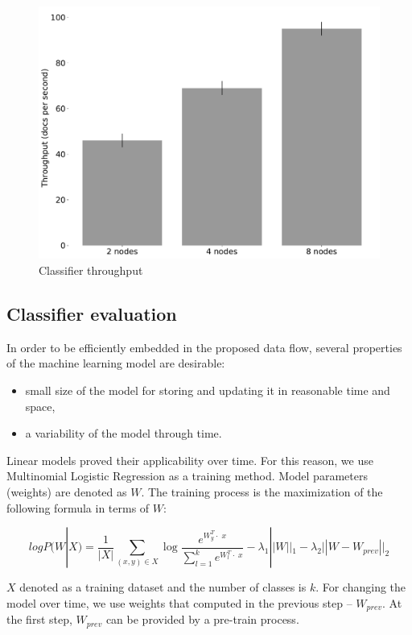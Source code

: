 \begin{figure}[htbp]
  \centering
  \includegraphics[scale=0.25]{pics/classifier_throughput}
  \caption{Classifier throughput}
  \label {throughput}
\end{figure}

\subsection{Classifier evaluation}

In order to be efficiently embedded in the proposed data flow, several properties of the machine learning model are desirable:
\begin{itemize}
     \item small size of the model for storing and updating it in reasonable time and space,
     \item a variability of the model through time.
\end{itemize}

Linear models proved their applicability over time. For this reason, we use Multinomial Logistic Regression as a training method. Model parameters (weights) are denoted as $W$. The training process is the maximization of the following formula in terms of $W$:

$$ logP(W | X) = \frac{1}{|X|} \sum \limits_{(x, y) \in X} \log \frac{e^{{W_y^T \cdot \; x}}}{\sum \limits_{l = 1}^{k}  e^{{W_{l}^T \cdot \; x}}} - \lambda_1 ||W||_1 - \lambda_2 ||W - W_{prev}||_2 $$ 

$X$ denoted as a training dataset and the number of classes is $k$. For changing the model over time, we use weights that computed in the previous step -- $W_{prev}$. At the first step, $W_{prev}$ can be provided by a pre-train process.


